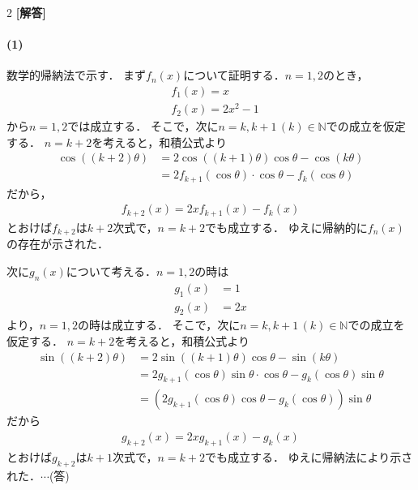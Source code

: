 \documentclass[../../main.tex]{subfiles}
\begin{document}
\setcounter{equation}{0}
\begin{oframed}
  
\end{oframed}
\setlength{\columnseprule}{0.4pt}
\begin{multicols}{2}
  {\bf [解答]}

  \paragraph{(1)}
  数学的帰納法で示す．
  まず$f_n(x)$について証明する．$n=1,2$のとき，
  \begin{align}
    & f_1(x)=x      \\
    & f_2(x)=2x^2-1
  \end{align}
  から$n=1,2$では成立する．
  そこで，次に$n=k,k+1\, (k)\in\mathbb{N}$での成立を仮定する．
  $n=k+2$を考えると，和積公式より
  \begin{align} \label{eq:1}
    \cos((k+2)\theta) & = 2\cos((k+1)\theta)\cos\theta - \cos(k\theta)            \\
    & = 2f_{k+1}(\cos\theta) \cdot \cos\theta - f_k(\cos\theta)
  \end{align}
  だから，
  \begin{align}
    f_{k+2}(x)=2xf_{k+1}(x)-f_k(x)
  \end{align}
  とおけば$f_{k+2}$は$k+2$次式で，$n=k+2$でも成立する．
  ゆえに帰納的に$f_n(x)$の存在が示された．

  次に$g_n(x)$について考える．$n=1,2$の時は
  \begin{align}
    g_1(x) & =1  \\
    g_2(x) & =2x
  \end{align}
  より，$n=1,2$の時は成立する．
  そこで，次に$n=k,k+1\, (k)\in\mathbb{N}$での成立を仮定する．
  $n=k+2$を考えると，和積公式より
  \begin{align} \label{eq:2}
    \sin((k+2)\theta) & = 2\sin((k+1)\theta)\cos\theta - \sin(k\theta)                               \\
    & = 2g_{k+1}(\cos\theta)\sin\theta\cdot \cos\theta - g_k(\cos\theta)\sin\theta \\
    & = \left(2g_{k+1}(\cos\theta)\cos\theta - g_k(\cos\theta)\right)\sin\theta
  \end{align}
  だから
  \begin{align}
    g_{k+2}(x)=2xg_{k+1}(x)-g_k(x)
  \end{align}
  とおけば$g_{k+2}$は$k+1$次式で，$n=k+2$でも成立する．
  ゆえに帰納法により示された．$\cdots$(答)


\end{multicols}
\end{document}
